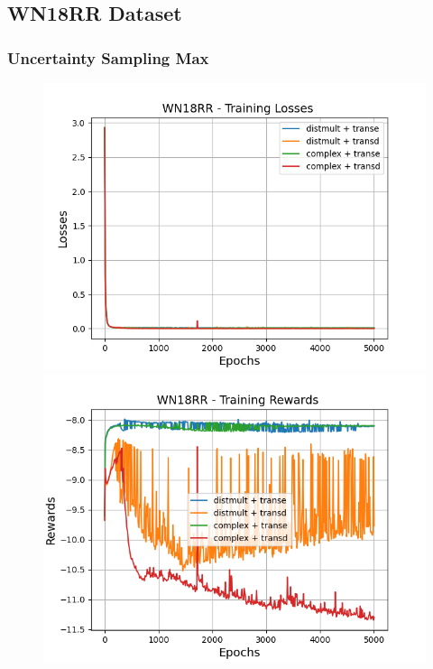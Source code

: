 \subsection{WN18RR Dataset}

\subsubsection{Uncertainty Sampling Max}

\begin{figure}
    \centering
    \begin{minipage}{.5\textwidth}
      \centering
      \includegraphics[width=0.9\linewidth]{figures/results/gan_train/not_pretrained/uncertainty/max/entropy/WN18RR/gan_train_uncertainty_wn18rr_losses.png}
    \end{minipage}%
    \begin{minipage}{.5\textwidth}
      \centering
      \includegraphics[width=0.9\linewidth]{figures/results/gan_train/not_pretrained/uncertainty/max/entropy/wn18rr/gan_train_uncertainty_wn18rr_rewards.png}

\end{minipage}
\end{figure}
